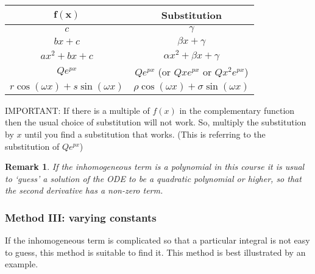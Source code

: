 \documentclass[12pt, a4paper]{article}
\newtheorem*{remark}{Remark}
\theoremstyle{definition}
\theoremstyle{plain}
\begin{document}
\begin{center}
\begin{tabular}{|c|c|} 
 \hline
 $\mathbf{f(x)}$ & \textbf{Substitution} \\ \hline
 $c$ & $\gamma$ \\ \hline
 $bx+c$ & $\beta x+ \gamma$ \\ \hline
 $ax^2+bx+c$ & $\alpha x^2+\beta x +\gamma$ \\ \hline
 $Qe^{px}$ & $Qe^{px}$ (or $Qxe^{px}$ or $Qx^2e^{px}$) \\ \hline
 $r\cos{(\omega x)}+s\sin{(\omega x)}$ & $\rho \cos{(\omega x)}+\sigma \sin{(\omega x)}$ \\ \hline
\end{tabular}
\end{center}

\begin{tcolorbox}
IMPORTANT: If there is a multiple of $f(x)$ in the complementary function then the usual choice of substitution will not work. So, multiply the substitution by $x$ until you find a substitution that works. (This is referring to the substitution of $Qe^{px}$)
\end{tcolorbox}

\begin{remark}
If the inhomogeneous term is a polynomial in this course it is usual to `guess' a solution of the ODE to be a quadratic polynomial or higher, so that the second derivative has a non-zero term.
\end{remark}

\subsubsection{Method III: varying constants}

If the inhomogeneous term is complicated so that a particular integral is not easy to guess, this method is suitable to find it. This method is best illustrated by an example.
\end{document}
